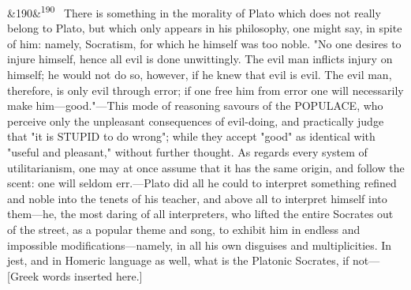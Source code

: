 \documentclass[12pt]{article}
\newcommand{\para}[1][]{\par\noindent\ifx&#1&\else\textsuperscript{\footnotesize #1}~\fi}
\begin{document}
\para[190] There is something in the morality of Plato which does not really belong to Plato, but which only appears in his philosophy, one might say, in spite of him: namely, Socratism, for which he himself was too noble. "No one desires to injure himself, hence all evil is done unwittingly. The evil man inflicts injury on himself; he would not do so, however, if he knew that evil is evil. The evil man, therefore, is only evil through error; if one free him from error one will necessarily make him---good."---This mode of reasoning savours of the POPULACE, who perceive only the unpleasant consequences of evil-doing, and practically judge that "it is STUPID to do wrong"; while they accept "good" as identical with "useful and pleasant," without further thought. As regards every system of utilitarianism, one may at once assume that it has the same origin, and follow the scent: one will seldom err.---Plato did all he could to interpret something refined and noble into the tenets of his teacher, and above all to interpret himself into them---he, the most daring of all interpreters, who lifted the entire Socrates out of the street, as a popular theme and song, to exhibit him in endless and impossible modifications---namely, in all his own disguises and multiplicities. In jest, and in Homeric language as well, what is the Platonic Socrates, if not---[Greek words inserted here.]
\end{document}
